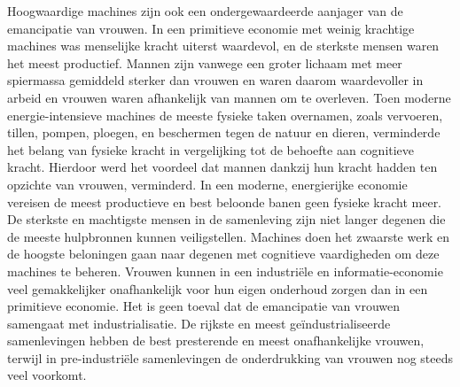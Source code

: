 Hoogwaardige machines zijn ook een ondergewaardeerde aanjager van de emancipatie van vrouwen. In een primitieve economie met weinig krachtige machines was menselijke kracht uiterst waardevol, en de sterkste mensen waren het meest productief. Mannen zijn vanwege een groter lichaam met meer spiermassa gemiddeld sterker dan vrouwen en waren daarom waardevoller in arbeid en vrouwen waren afhankelijk van mannen om te overleven. Toen moderne energie-intensieve machines de meeste fysieke taken overnamen, zoals vervoeren, tillen, pompen, ploegen, en beschermen tegen de natuur en dieren, verminderde het belang van fysieke kracht in vergelijking tot de behoefte aan cognitieve kracht. Hierdoor werd het voordeel dat mannen dankzij hun kracht hadden ten opzichte van vrouwen, verminderd. In een moderne, energierijke economie vereisen de meest productieve en best beloonde banen geen fysieke kracht meer. De sterkste en machtigste mensen in de samenleving zijn niet langer degenen die de meeste hulpbronnen kunnen veiligstellen. Machines doen het zwaarste werk en de hoogste beloningen gaan naar degenen met cognitieve vaardigheden om deze machines te beheren. Vrouwen kunnen in een industriële en informatie-economie veel gemakkelijker onafhankelijk voor hun eigen onderhoud zorgen dan in een primitieve economie. Het is geen toeval dat de emancipatie van vrouwen samengaat met industrialisatie. De rijkste en meest geïndustrialiseerde samenlevingen hebben de best presterende en meest onafhankelijke vrouwen, terwijl in pre-industriële samenlevingen de onderdrukking van vrouwen nog steeds veel voorkomt.
